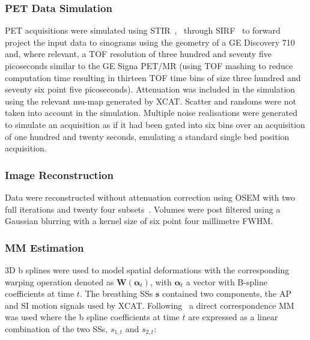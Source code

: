             \subsubsection{PET Data Simulation} \label{impact_of_tof_on_respiratory_motion_modelling_using_nac_pet_methods_pet_data_simulation}
                \gls{PET} acquisitions were simulated using \gls{STIR}~,~ through \gls{SIRF}~ to forward project the input data to sinograms using the geometry of a GE Discovery 710 and, where relevant, a \gls{TOF} resolution of three hundred and seventy five picoseconds similar to the GE Signa \gls{PET}/\gls{MR} (using \gls{TOF} mashing to reduce computation time resulting in thirteen \gls{TOF} time bins of size three hundred and seventy six point five picoseconds). Attenuation was included in the simulation using the relevant \gls{mu-map} generated by \gls{XCAT}. Scatter and randoms were not taken into account in the simulation. Multiple noise realisations were generated to simulate an acquisition as if it had been gated into six bins over an acquisition of one hundred and twenty seconds, emulating a standard single bed position acquisition. 
            
            \subsubsection{Image Reconstruction} \label{impact_of_tof_on_respiratory_motion_modelling_using_nac_pet_methods_image_reconstruction}
                Data were reconstructed without attenuation correction using \gls{OSEM} with two full iterations and twenty four subsets~. Volumes were post filtered using a Gaussian blurring with a kernel size of six point four millimetre \gls{FWHM}.
            
            \subsubsection{\gls{MM} Estimation} \label{impact_of_tof_on_respiratory_motion_modelling_using_nac_pet_methods_motion_model_estimation}
                \gls{3D} b splines were used to model spatial deformations with the corresponding warping operation denoted as $\mathbf{W}(\mathbf{\alpha}_t)$, with $\mathbf{\alpha}_t$ a vector with B-spline coefficients at time $t$. The breathing \gls{SS}s $\mathbf{s}$ contained two components, the \gls{AP} and \gls{SI} motion signals used by \gls{XCAT}. Following~ a direct correspondence \gls{MM} was used where the b spline coefficients at time $t$ are expressed as a linear combination of the two \gls{SS}s, $s_{1,t}$ and $s_{2,t}$:
            
